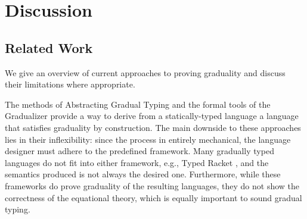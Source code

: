 \section{Discussion}\label{sec:discussion}

\subsection{Related Work}

We give an overview of current approaches to proving graduality and discuss
their limitations where appropriate.


The methods of Abstracting Gradual Typing \cite{garcia-clark-tanter2016} and the
formal tools of the Gradualizer \cite{cimini-siek2016} provide a way to derive
from a statically-typed language a language that satisfies graduality by
construction. The main downside to these approaches lies in their inflexibility:
since the process in entirely mechanical, the language designer must adhere to
the predefined framework.  Many gradually typed languages do not fit into either
framework, e.g., Typed Racket \cite{tobin-hochstadt06, tobin-hochstadt08}, and
the semantics produced is not always the desired one.
%
Furthermore, while these frameworks do prove graduality of the resulting
languages, they do not show the correctness of the equational theory, which is
equally important to sound gradual typing.



